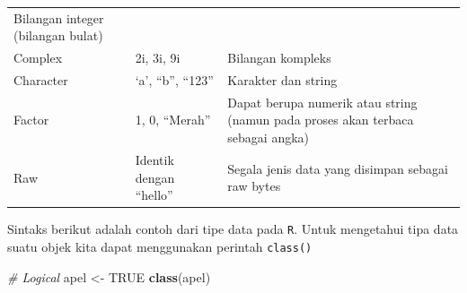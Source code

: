 \documentclass[12pt,]{krantz}
\newenvironment{Shaded}{\begin{snugshade}}{\end{snugshade}}
\newcommand{\CommentTok}[1]{\textcolor[rgb]{0.56,0.35,0.01}{\textit{#1}}}
\newcommand{\KeywordTok}[1]{\textcolor[rgb]{0.13,0.29,0.53}{\textbf{#1}}}
\newcommand{\NormalTok}[1]{#1}
\newcommand{\OtherTok}[1]{\textcolor[rgb]{0.56,0.35,0.01}{#1}}
\newcommand{\StringTok}[1]{\textcolor[rgb]{0.31,0.60,0.02}{#1}}
\begin{document}
\begin{longtable}[]{@{}lll@{}}
\begin{minipage}[t]{0.61\columnwidth}
Bilangan integer (bilangan bulat)\strut
\end{minipage}\tabularnewline
\begin{minipage}[t]{0.11\columnwidth}\raggedright
Complex\strut
\end{minipage} & \begin{minipage}[t]{0.19\columnwidth}\raggedright
2i, 3i, 9i\strut
\end{minipage} & \begin{minipage}[t]{0.61\columnwidth}\raggedright
Bilangan kompleks\strut
\end{minipage}\tabularnewline
\begin{minipage}[t]{0.11\columnwidth}\raggedright
Character\strut
\end{minipage} & \begin{minipage}[t]{0.19\columnwidth}\raggedright
`a', ``b'', ``123''\strut
\end{minipage} & \begin{minipage}[t]{0.61\columnwidth}\raggedright
Karakter dan string\strut
\end{minipage}\tabularnewline
\begin{minipage}[t]{0.11\columnwidth}\raggedright
Factor\strut
\end{minipage} & \begin{minipage}[t]{0.19\columnwidth}\raggedright
1, 0, ``Merah''\strut
\end{minipage} & \begin{minipage}[t]{0.61\columnwidth}\raggedright
Dapat berupa numerik atau string (namun pada proses akan terbaca sebagai angka)\strut
\end{minipage}\tabularnewline
\begin{minipage}[t]{0.11\columnwidth}\raggedright
Raw\strut
\end{minipage} & \begin{minipage}[t]{0.19\columnwidth}\raggedright
Identik dengan ``hello''\strut
\end{minipage} & \begin{minipage}[t]{0.61\columnwidth}\raggedright
Segala jenis data yang disimpan sebagai raw bytes\strut
\end{minipage}\tabularnewline
\bottomrule
\end{longtable}

Sintaks berikut adalah contoh dari tipe data pada \texttt{R}. Untuk mengetahui tipa data suatu objek kita dapat menggunakan perintah \texttt{class()}

\begin{Shaded}
\begin{Highlighting}[]
\CommentTok{# Logical}
\NormalTok{apel <-}\StringTok{ }\OtherTok{TRUE}
\KeywordTok{class}\NormalTok{(apel)}
\end{Highlighting}
\end{Shaded}
\end{document}
